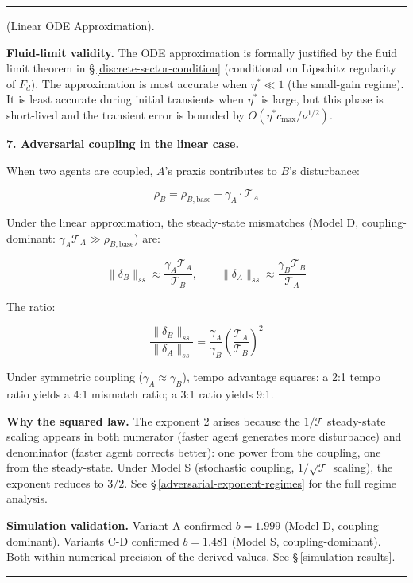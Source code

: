 \documentclass[11pt,oneside]{article}
\newcounter{claim}[section]
\renewcommand{\theclaim}{\thesection.\arabic{claim}}
\newenvironment{segment}[2]{%
  \refstepcounter{claim}%
  \bigskip\noindent\hrule\smallskip
  \noindent{\bfseries #1~\theclaim}\enskip(#2).\par\smallskip
  \noindent\ignorespaces
}{%
  \par\smallskip\noindent\hrule\bigskip
}
\newenvironment{detail}[1][]{\begin{segment}{Detail}{#1}}{\end{segment}}
\begin{document}
\begin{detail}[Linear ODE Approximation]
\textbf{Fluid-limit validity.} The ODE approximation is formally justified by the fluid limit theorem in \S\,\ref{discrete-sector-condition} (conditional on Lipschitz regularity of $F_d$). The approximation is most accurate when $\eta^* \ll 1$ (the small-gain regime). It is least accurate during initial transients when $\eta^*$ is large, but this phase is short-lived and the transient error is bounded by $O(\eta^* c_{\max} / \nu^{1/2})$.


\medskip\noindent\textbf{7. Adversarial coupling in the linear case.}


When two agents are coupled, $A$'s praxis contributes to $B$'s disturbance:


$$\rho_B = \rho_{B,\text{base}} + \gamma_A \cdot \mathcal{T}_A$$

Under the linear approximation, the steady-state mismatches (Model D, coupling-dominant: $\gamma_A \mathcal{T}_A \gg \rho_{B,\text{base}}$) are:


$$\lVert\delta_B\rVert_{ss} \approx \frac{\gamma_A \mathcal{T}_A}{\mathcal{T}_B}, \qquad \lVert\delta_A\rVert_{ss} \approx \frac{\gamma_B \mathcal{T}_B}{\mathcal{T}_A}$$

The ratio:


$$\frac{\lVert\delta_B\rVert_{ss}}{\lVert\delta_A\rVert_{ss}} = \frac{\gamma_A}{\gamma_B}\left(\frac{\mathcal{T}_A}{\mathcal{T}_B}\right)^2$$

Under symmetric coupling ($\gamma_A \approx \gamma_B$), tempo advantage squares: a 2:1 tempo ratio yields a 4:1 mismatch ratio; a 3:1 ratio yields 9:1.

\textbf{Why the squared law.} The exponent 2 arises because the $1/\mathcal{T}$ steady-state scaling appears in both numerator (faster agent generates more disturbance) and denominator (faster agent corrects better): one power from the coupling, one from the steady-state. Under Model S (stochastic coupling, $1/\sqrt{\mathcal{T}}$ scaling), the exponent reduces to $3/2$. See \S\,\ref{adversarial-exponent-regimes} for the full regime analysis.

\textbf{Simulation validation.} Variant A confirmed $b = 1.999$ (Model D, coupling-dominant). Variants C-D confirmed $b = 1.481$ (Model S, coupling-dominant). Both within numerical precision of the derived values. See \S\,\ref{simulation-results}.



\end{detail}
\end{document}
